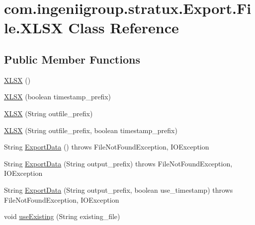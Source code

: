 \hypertarget{classcom_1_1ingeniigroup_1_1stratux_1_1_export_1_1_file_1_1_x_l_s_x}{}\section{com.\+ingeniigroup.\+stratux.\+Export.\+File.\+X\+L\+SX Class Reference}
\label{classcom_1_1ingeniigroup_1_1stratux_1_1_export_1_1_file_1_1_x_l_s_x}
\subsection*{Public Member Functions}
\begin{DoxyCompactItemize}
\item 
\hyperlink{classcom_1_1ingeniigroup_1_1stratux_1_1_export_1_1_file_1_1_x_l_s_x_aabe2f65c1f64183c64e676908edbc5b6}{X\+L\+SX} ()
\item 
\hyperlink{classcom_1_1ingeniigroup_1_1stratux_1_1_export_1_1_file_1_1_x_l_s_x_a5cbf167bdcdfbbc85c845e581bc0aab2}{X\+L\+SX} (boolean timestamp\+\_\+prefix)
\item 
\hyperlink{classcom_1_1ingeniigroup_1_1stratux_1_1_export_1_1_file_1_1_x_l_s_x_a8dfb9ef6aef0c9bd750a1c20243f20ac}{X\+L\+SX} (String outfile\+\_\+prefix)
\item 
\hyperlink{classcom_1_1ingeniigroup_1_1stratux_1_1_export_1_1_file_1_1_x_l_s_x_abb6a4bd4b69033cdaeeef63f4a0cb6d1}{X\+L\+SX} (String outfile\+\_\+prefix, boolean timestamp\+\_\+prefix)
\item 
String \hyperlink{classcom_1_1ingeniigroup_1_1stratux_1_1_export_1_1_file_1_1_x_l_s_x_a1c4b9aa86e2c067df17364dac3d11ef5}{Export\+Data} ()  throws File\+Not\+Found\+Exception, I\+O\+Exception 
\item 
String \hyperlink{classcom_1_1ingeniigroup_1_1stratux_1_1_export_1_1_file_1_1_x_l_s_x_a8e908fe0609381b0d3328d36220b2d87}{Export\+Data} (String output\+\_\+prefix)  throws File\+Not\+Found\+Exception, I\+O\+Exception 
\item 
String \hyperlink{classcom_1_1ingeniigroup_1_1stratux_1_1_export_1_1_file_1_1_x_l_s_x_a398e3c56f4c01776b3d441d1c0a47e4e}{Export\+Data} (String output\+\_\+prefix, boolean use\+\_\+timestamp)  throws File\+Not\+Found\+Exception, I\+O\+Exception 
\item 
void \hyperlink{classcom_1_1ingeniigroup_1_1stratux_1_1_export_1_1_file_1_1_x_l_s_x_afa9311902d886f5b24d2b626ddc55a72}{use\+Existing} (String existing\+\_\+file)
\end{DoxyCompactItemize}


